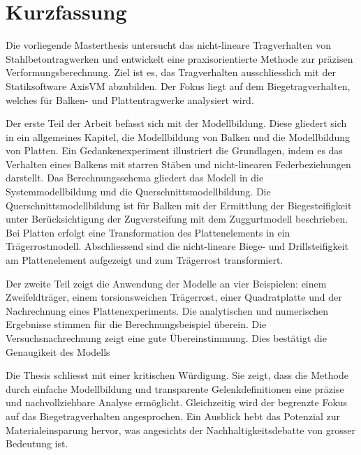 \chapter*{Kurzfassung}

Die vorliegende Masterthesis untersucht das nicht-lineare Tragverhalten von Stahlbetontragwerken und entwickelt eine praxisorientierte Methode zur präzisen Verformungsberechnung. Ziel ist es, das Tragverhalten ausschliesslich mit der Statiksoftware AxisVM abzubilden. Der Fokus liegt auf dem Biegetragverhalten, welches für Balken- und Plattentragwerke analysiert wird.

Der erste Teil der Arbeit befasst sich mit der Modellbildung. Diese gliedert sich in ein allgemeines Kapitel, die Modellbildung von Balken und die Modellbildung von Platten. Ein Gedankenexperiment illustriert die Grundlagen, indem es das Verhalten eines Balkens mit starren Stäben und nicht-linearen Federbeziehungen darstellt. Das Berechnungsschema gliedert das Modell in die Systemmodellbildung und die Querschnittsmodellbildung. Die Querschnittsmodellbildung ist für Balken mit der Ermittlung der  Biegesteifigkeit unter Berücksichtigung der Zugversteifung mit dem Zuggurtmodell beschrieben. Bei Platten erfolgt eine Transformation des Plattenelements in ein Trägerrostmodell. Abschliessend sind die nicht-lineare Biege- und Drillsteifigkeit am Plattenelement aufgezeigt und zum Trägerrost transformiert.

Der zweite Teil zeigt die Anwendung der Modelle an vier Beispielen: einem Zweifeldträger, einem torsionsweichen Trägerrost, einer Quadratplatte und der Nachrechnung eines Plattenexperiments. Die analytischen und numerischen Ergebnisse stimmen für die Berechnungsbeispiel überein. Die Versuchsnachrechnung zeigt eine gute Übereinstimmung. Dies bestätigt die Genaugikeit des Modells

Die Thesis schliesst mit einer kritischen Würdigung. Sie zeigt, dass die Methode durch einfache Modellbildung und transparente Gelenkdefinitionen eine präzise und nachvollziehbare Analyse ermöglicht. Gleichzeitig wird der begrenzte Fokus auf das Biegetragverhalten angesprochen. Ein Ausblick hebt das Potenzial zur Materialeinsparung hervor, was angesichts der Nachhaltigkeitsdebatte von grosser Bedeutung ist.